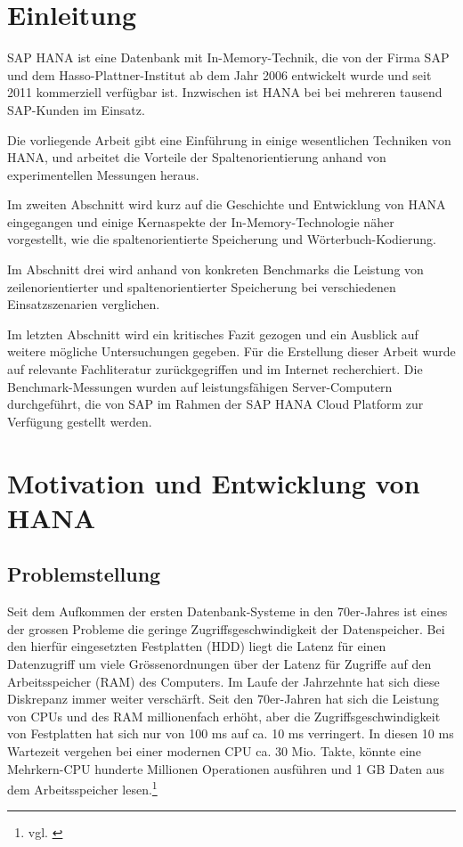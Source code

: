 \section{Einleitung}
SAP HANA ist eine Datenbank mit In-Memory-Technik, die von der Firma SAP und dem
Hasso-Plattner-Institut ab dem Jahr 2006 entwickelt wurde und seit 2011 kommerziell
verfügbar ist. Inzwischen ist HANA bei bei mehreren tausend SAP-Kunden im Einsatz.

Die vorliegende Arbeit gibt eine Einführung in einige wesentlichen
Techniken von HANA, und arbeitet die Vorteile der Spaltenorientierung
anhand von experimentellen Messungen heraus.

Im zweiten Abschnitt wird kurz auf die Geschichte und Entwicklung von HANA eingegangen und
einige Kernaspekte der In-Memory-Technologie näher vorgestellt, 
wie die spaltenorientierte Speicherung und Wörterbuch-Kodierung.

Im Abschnitt drei wird anhand von konkreten Benchmarks die Leistung von 
zeilenorientierter und spaltenorientierter Speicherung bei verschiedenen
Einsatzszenarien verglichen.

Im letzten Abschnitt wird ein kritisches Fazit gezogen und ein Ausblick auf weitere 
mögliche Untersuchungen gegeben. Für die Erstellung dieser Arbeit wurde auf 
relevante Fachliteratur zurückgegriffen und im Internet recherchiert. 
Die Benchmark-Messungen wurden auf leistungsfähigen Server-Computern durchgeführt, 
die von SAP im Rahmen der SAP HANA Cloud Platform zur Verfügung gestellt werden.

\section{Motivation und Entwicklung von HANA}
\subsection{Problemstellung}
Seit dem Aufkommen der ersten Datenbank-Systeme in den 70er-Jahres ist eines der
grossen Probleme die geringe Zugriffsgeschwindigkeit der Datenspeicher.
Bei den hierfür eingesetzten Festplatten (HDD) liegt die Latenz für einen Datenzugriff
um viele Grössenordnungen über der Latenz für Zugriffe auf den Arbeitsspeicher (RAM)
des Computers. Im Laufe der Jahrzehnte hat sich diese Diskrepanz immer weiter verschärft.
Seit den 70er-Jahren hat sich die Leistung von CPUs und des RAM millionenfach erhöht,
aber die Zugriffsgeschwindigkeit von Festplatten hat sich nur von 100 ms auf ca. 
10 ms verringert. In diesen 10 ms Wartezeit vergehen bei einer modernen CPU ca. 30 Mio. Takte,
könnte eine Mehrkern-CPU hunderte Millionen Operationen ausführen und 1 GB 
Daten aus dem Arbeitsspeicher lesen.\footnote{vgl. \cite{Intel2016}}

